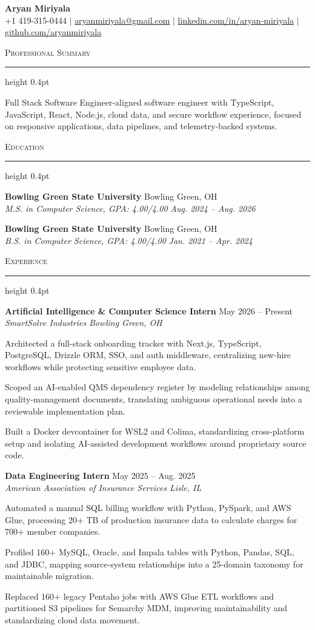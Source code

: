 \documentclass[letterpaper,11pt]{article}
\newcommand{\resumesection}[1]{%
  \par\vspace{2pt}%
  {\large\scshape #1}\par\vspace{2pt}%
  \hrule height 0.4pt\vspace{2pt}%
}
\newcommand{\resumeSubheading}[4]{
  \textbf{#1} \hfill #2\\
  \textit{#3} \hfill \textit{#4}
}
\begin{document}
\begin{center}
  {\LARGE \textbf{Aryan Miriyala}}\\[-1pt]
  \small
  +1 419-315-0444 $|$
  \href{mailto:aryanmiriyala@gmail.com}{aryanmiriyala@gmail.com} $|$
  \href{https://www.linkedin.com/in/aryan-miriyala-7788a21b6/}{linkedin.com/in/aryan-miriyala} $|$
  \href{https://github.com/aryanmiriyala}{github.com/aryanmiriyala}
\end{center}\vspace{-10pt}

\resumesection{Professional Summary}
Full Stack Software Engineer-aligned software engineer with TypeScript, JavaScript, React, Node.js, cloud data, and secure workflow experience, focused on responsive applications, data pipelines, and telemetry-backed systems.

\resumesection{Education}
\resumeSubheading
{Bowling Green State University}{Bowling Green, OH}
{M.S. in Computer Science, GPA: 4.00/4.00}{Aug. 2024 -- Aug. 2026}

\resumeSubheading
{Bowling Green State University}{Bowling Green, OH}
{B.S. in Computer Science, GPA: 4.00/4.00}{Jan. 2021 -- Apr. 2024}

\resumesection{Experience}
\resumeSubheading
{Artificial Intelligence \& Computer Science Intern}{May 2026 -- Present}
{SmartSolve Industries}{Bowling Green, OH}
\begin{tightitemize}
  \item Architected a full-stack onboarding tracker with Next.js, TypeScript, PostgreSQL, Drizzle ORM, SSO, and auth middleware, centralizing new-hire workflows while protecting sensitive employee data.
  \item Scoped an AI-enabled QMS dependency register by modeling relationships among quality-management documents, translating ambiguous operational needs into a reviewable implementation plan.
  \item Built a Docker devcontainer for WSL2 and Colima, standardizing cross-platform setup and isolating AI-assisted development workflows around proprietary source code.
\end{tightitemize}

\resumeSubheading
{Data Engineering Intern}{May 2025 -- Aug. 2025}
{American Association of Insurance Services}{Lisle, IL}
\begin{tightitemize}
  \item Automated a manual SQL billing workflow with Python, PySpark, and AWS Glue, processing 20+ TB of production insurance data to calculate charges for 700+ member companies.
  \item Profiled 160+ MySQL, Oracle, and Impala tables with Python, Pandas, SQL, and JDBC, mapping source-system relationships into a 25-domain taxonomy for maintainable migration.
  \item Replaced 160+ legacy Pentaho jobs with AWS Glue ETL workflows and partitioned S3 pipelines for Semarchy MDM, improving maintainability and standardizing cloud data movement.
\end{tightitemize}
\end{document}
